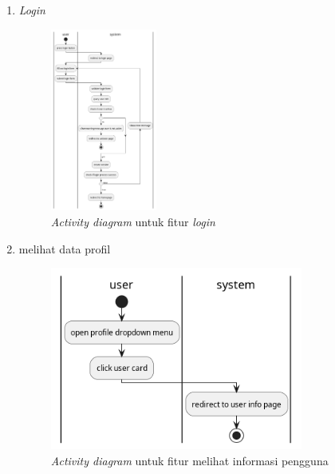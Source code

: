 \documentclass[a4paper]{article}
\begin{document}
\begin{enumerate}
\begin{enumerate}
        \item \textit{Login}\\
        \begin{figure}[h]
            \centering
            \includegraphics*[height=6cm]{diagram/activity diagram/3. login/login.png}
            \caption{\textit{Activity diagram} untuk fitur \textit{login}}
        \end{figure}
        \item melihat data profil\\
        \begin{figure}[h]
            \centering
            \includegraphics*[height=6cm]{diagram/activity diagram/4. see user info/see user info.png}
            \caption{\textit{Activity diagram} untuk fitur melihat informasi pengguna}
        \end{figure}
        \newpage
        

\end{enumerate}
\end{enumerate}
\end{document}

